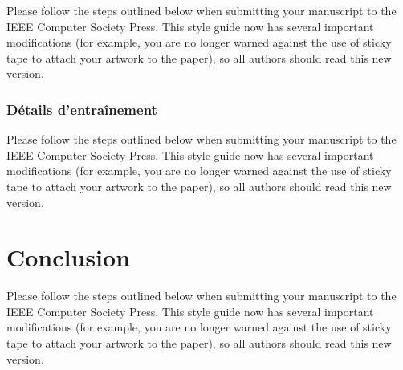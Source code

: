 \documentclass[10pt,twocolumn,letterpaper,french]{article}
\begin{document}
Please follow the steps outlined below when submitting your manuscript to
the IEEE Computer Society Press.  This style guide now has several
important modifications (for example, you are no longer warned against the
use of sticky tape to attach your artwork to the paper), so all authors
should read this new version.

\subsubsection*{Détails d’entraînement}

Please follow the steps outlined below when submitting your manuscript to
the IEEE Computer Society Press.  This style guide now has several
important modifications (for example, you are no longer warned against the
use of sticky tape to attach your artwork to the paper), so all authors
should read this new version.

\section*{Conclusion}

Please follow the steps outlined below when submitting your manuscript to
the IEEE Computer Society Press.  This style guide now has several
important modifications (for example, you are no longer warned against the
use of sticky tape to attach your artwork to the paper), so all authors
should read this new version.




{\small


}
\end{document}
